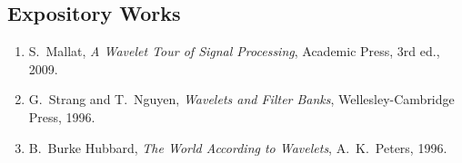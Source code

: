 \subsection*{Expository Works}
\begin{enumerate}
    \item S.\ Mallat, \textit{A Wavelet Tour of Signal Processing}, Academic Press, 3rd ed., 2009.
    \item G.\ Strang and T.\ Nguyen, \textit{Wavelets and Filter Banks}, Wellesley-Cambridge Press, 1996.
    \item B.\ Burke Hubbard, \textit{The World According to Wavelets}, A.\ K.\ Peters, 1996.
\end{enumerate}

